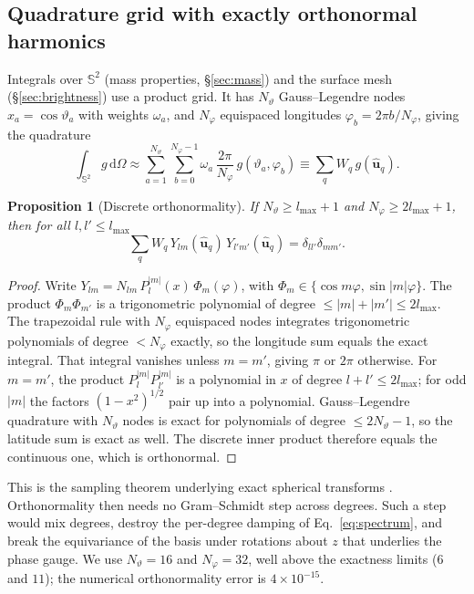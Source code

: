 \documentclass[11pt,a4paper]{article}
\newtheorem{proposition}{Proposition}
\theoremstyle{remark}
\newcommand{\uv}[1]{\hat{\bm{#1}}}
\newcommand{\Sph}{\mathbb{S}^2}
\newcommand{\dd}{\,\mathrm{d}}
\begin{document}
\subsection{Quadrature grid with exactly orthonormal harmonics}
\label{sec:quadrature}
Integrals over $\Sph$ (mass properties, \S\ref{sec:mass}) and the surface mesh (\S\ref{sec:brightness})
use a product grid. It has $N_\vartheta$ Gauss--Legendre nodes $x_a=\cos\vartheta_a$ with weights
$\omega_a$, and $N_\varphi$ equispaced longitudes $\varphi_b=2\pi b/N_\varphi$, giving the quadrature
\begin{equation}
  \int_{\Sph}g\dd\Omega\approx\sum_{a=1}^{N_\vartheta}\sum_{b=0}^{N_\varphi-1}\omega_a\,\frac{2\pi}{N_\varphi}\,g(\vartheta_a,\varphi_b)
  \equiv\sum_q W_q\,g(\uv u_q).
  \label{eq:quad}
\end{equation}

\begin{proposition}[Discrete orthonormality]
\label{prop:ortho}
If $N_\vartheta\ge l_{\max}+1$ and $N_\varphi\ge2l_{\max}+1$, then for all $l,l'\le l_{\max}$
\begin{equation*}
  \sum_qW_q\,Y_{lm}(\uv u_q)\,Y_{l'm'}(\uv u_q)=\delta_{ll'}\delta_{mm'} .
\end{equation*}
\end{proposition}
\begin{proof}
Write $Y_{lm}=N_{lm}\,P_l^{|m|}(x)\,\Phi_m(\varphi)$, with $\Phi_m\in\{\cos m\varphi,\sin|m|\varphi\}$.
The product $\Phi_m\Phi_{m'}$ is a trigonometric polynomial of degree $\le|m|+|m'|\le2l_{\max}$. The
trapezoidal rule with $N_\varphi$ equispaced nodes integrates trigonometric polynomials of degree
$<N_\varphi$ exactly, so the longitude sum equals the exact integral. That integral vanishes unless
$m=m'$, giving $\pi$ or $2\pi$ otherwise. For $m=m'$, the product $P_l^{|m|}P_{l'}^{|m|}$ is a
polynomial in $x$ of degree $l+l'\le2l_{\max}$; for odd $|m|$ the factors
$(1-x^2)^{1/2}$ pair up into a polynomial. Gauss--Legendre quadrature with $N_\vartheta$ nodes is exact
for polynomials of degree $\le2N_\vartheta-1$, so the latitude sum is exact as well. The discrete inner
product therefore equals the continuous one, which is orthonormal.
\end{proof}
This is the sampling theorem underlying exact spherical transforms \citep[cf.][]{driscoll1994}.
Orthonormality then needs no Gram--Schmidt step across degrees. Such a step would mix degrees, destroy
the per-degree damping of Eq.~\eqref{eq:spectrum}, and break the equivariance of the basis under
rotations about $z$ that underlies the phase gauge. We use $N_\vartheta=16$ and $N_\varphi=32$,
well above the exactness limits ($6$ and $11$); the numerical orthonormality error is
$4\times10^{-15}$.
\end{document}
